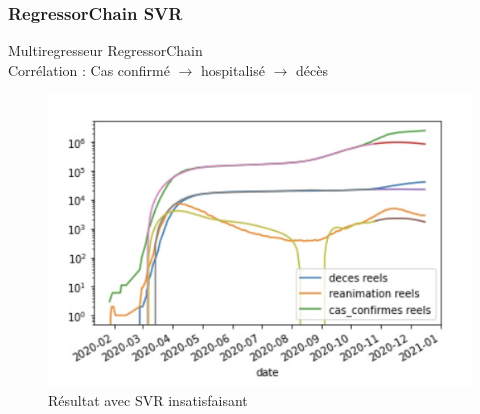 \documentclass{beamer}
\begin{document}
\begin{frame}%
	\frametitle{RegressorChain SVR}
	Multiregresseur RegressorChain\\ Corrélation : Cas confirmé $\rightarrow$ hospitalisé $\rightarrow$ décès 
	
	\begin{figure}[h]
		\includegraphics[scale=0.43]{mulitregr_epic_fail}
		\caption{Résultat avec SVR insatisfaisant}
	\end{figure}
\end{frame}
\end{document}
